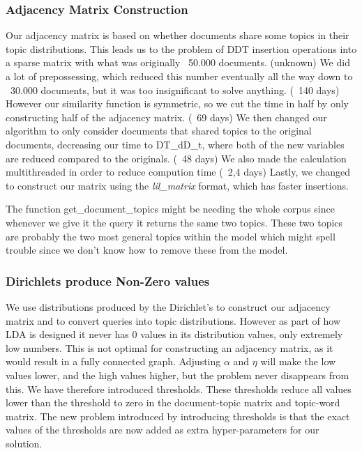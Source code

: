 \subsubsection{Adjacency Matrix Construction}
Our adjacency matrix is based on whether documents share some topics in their topic distributions. 
This leads us to the problem of D\*D\*T insertion operations into a sparse matrix with what was originally ~50.000 documents. (unknown)
We did a lot of prepossessing, which reduced this number eventually all the way down to ~30.000 documents, but it was too insignificant to solve anything. (~140 days)
However our similarity function is symmetric, so we cut the time in half by only constructing half of the adjacency matrix. (~69 days)
We then changed our algorithm to only consider documents that shared topics to the original documents, decreasing our time to D\*T\_d\*D\_t, where both of the new variables are reduced compared to the originals. (~48 days)
We also made the calculation multithreaded in order to reduce compution time (~2,4 days)
Lastly, we changed to construct our matrix using the \emph{lil\_matrix} format, which has faster insertions.


The function get\_document\_topics might be needing the whole corpus since whenever we give it the query it returns the same two topics. 
These two topics are probably the two most general topics within the model which might spell trouble since we don't know how to remove these from the model.

\subsubsection{Dirichlets produce Non-Zero values}
We use distributions produced by the Dirichlet's to construct our adjacency matrix and to convert queries into topic distributions. 
However as part of how LDA is designed it never has 0 values in its distribution values, only extremely low numbers.
This is not optimal for constructing an adjacency matrix, as it would result in a fully connected graph.
Adjusting $\alpha$ and $\eta$ will make the low values lower, and the high values higher, but the problem never disappears from this.
We have therefore introduced thresholds. 
These thresholds reduce all values lower than the threshold to zero in the document-topic matrix and topic-word matrix.
The new problem introduced by introducing thresholds is that the exact values of the thresholds are now added as extra hyper-parameters for our solution.

